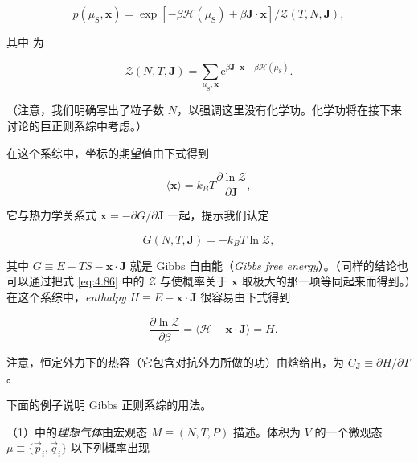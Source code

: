 \begin{equation}\label{eq:4.85}
  p(\mu_{\text{S}},\mathbf x)=\exp\left[-\beta\mathscr H(\mu_{\text{S}})+\beta\mathbf J\cdot\mathbf x\right]/\mathcal{Z}(T,N,\mathbf J),
\end{equation}

其中 为

\begin{equation}\label{eq:4.86}
  \mathcal{Z}(N,T,\mathbf J)=\sum_{\mu_{\text{S}},\mathbf x}\mathrm{e}^{\beta\mathbf J\cdot\mathbf x-\beta\mathscr H(\mu_{\text{S}})}.
\end{equation}

（注意，我们明确写出了粒子数 $N$，以强调这里没有化学功。化学功将在接下来讨论的巨正则系综中考虑。）


在这个系综中，坐标的期望值由下式得到

\begin{equation}\label{eq:4.87}
  \langle\mathbf x\rangle=k_BT\frac{\partial\ln\mathcal{Z}}{\partial\mathbf J},
\end{equation}

它与热力学关系式 $\mathbf x=-\partial G/\partial\mathbf J$ 一起，提示我们认定

\begin{equation}\label{eq:4.88}
  G(N,T,\mathbf J)=-k_BT\ln\mathcal{Z},
\end{equation}

其中 $G\equiv E-TS-\mathbf x\cdot\mathbf J$ 就是 Gibbs 自由能（\textit{Gibbs free energy}）。（同样的结论也可以通过把式 \eqref{eq:4.86} 中的 $\mathcal{Z}$ 与使概率关于 $\mathbf x$ 取极大的那一项等同起来而得到。）在这个系综中，\textit{enthalpy} $H\equiv E-\mathbf x\cdot\mathbf J$ 很容易由下式得到

\begin{equation}\label{eq:4.89}
  -\frac{\partial\ln\mathcal{Z}}{\partial\beta}=\langle\mathscr H-\mathbf x\cdot\mathbf J\rangle=H.
\end{equation}

注意，恒定外力下的热容（它包含对抗外力所做的功）由焓给出，为 $C_{\mathbf J}\equiv\partial H/\partial T$。

下面的例子说明 Gibbs 正则系综的用法。

（1）中的\emph{理想气体}由宏观态 $M\equiv(N,T,P)$ 描述。体积为 $V$ 的一个微观态 $\mu\equiv\{\vec p_i,\vec q_i\}$ 以下列概率出现

